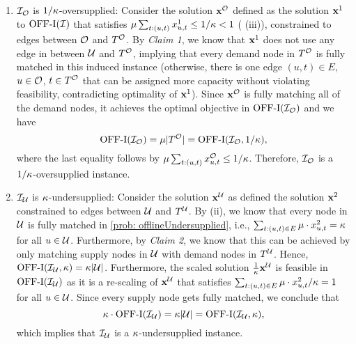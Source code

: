 {\begin{enumerate}
    \item $\mathcal I_{\mathcal O}$ is $1/\kappa$-oversupplied: Consider the solution $\mathbf{x}^\mathcal O$ defined as the solution $\mathbf{x}^1$ to $\mathrm{\mathrm{OFF}}\textrm{-}\mathrm{I}(\mathcal I)$ that satisfies $\mu \sum_{t:(u,t)} x_{u,t}^1 \leq 1/\kappa<1$ ( (iii)), constrained to edges between $\mathcal O$ and $T^\mathcal O$. By \emph{Claim 1}, we know that $\mathbf{x}^1$ does not use any edge in between $\mathcal U$ and $T^\mathcal O$, implying that every demand node in $T^\mathcal O$ is fully matched in this induced instance (otherwise, there is one edge $(u,t) \in E$, $u \in \mathcal O$, $t \in T^\mathcal O$ that can be assigned more capacity without violating feasibility, contradicting optimality of $\mathbf{x}^1$). Since $\mathbf{x}^\mathcal O$ is fully matching all of the demand nodes, it achieves the optimal objective in $\mathrm{\mathrm{OFF}}\textrm{-}\mathrm{I}(\mathcal I_\mathcal O)$ and we have
    \begin{equation*}
        \mathrm{\mathrm{OFF}}\textrm{-}\mathrm{I}(\mathcal I_\mathcal O) = \mu |T^\mathcal O|=\mathrm{\mathrm{OFF}}\textrm{-}\mathrm{I}(\mathcal I_\mathcal O, 1/\kappa),
    \end{equation*}
    where the last equality follows by $\mu \sum_{t:(u,t)} x_{u,t}^\mathcal O \leq 1/\kappa$. Therefore, $\mathcal I_\mathcal O$ is a $1/\kappa$-oversupplied instance.
    \item $\mathcal I_{\mathcal U}$ is $\kappa$-undersupplied: Consider the solution $\mathbf{x}^\mathcal U$ as defined the solution $\mathbf{x}^2$
    constrained to edges between $\mathcal U$ and $T^{\mathcal U}$. By  (ii), we know that every node in $\mathcal U$ is fully matched in \ref{prob: offlineUndersupplied}, i.e., $\sum_{t:(u,t) \in E} \mu \cdot x_{u,t}^2 = \kappa$ for all $u \in \mathcal U$. Furthermore, by \emph{Claim 2}, we know that this can be achieved by only matching supply nodes in $\mathcal U$ with demand nodes in $T^{\mathcal U}$. Hence, $\mathrm{\mathrm{OFF}}\textrm{-}\mathrm{I}(\mathcal I_{\mathcal U}, \kappa) = \kappa |\mathcal U|$. Furthermore, the scaled solution $\frac{1}{\kappa} \mathbf{x}^\mathcal U$ is feasible in $\mathrm{\mathrm{OFF}}\textrm{-}\mathrm{I}(\mathcal I_{\mathcal U})$ as it is a re-scaling of $\mathbf{x}^\mathcal U$ that satisfies $\sum_{t:(u,t) \in E} \mu \cdot x_{u,t}^2 / \kappa = 1$ for all $u \in \mathcal U$. Since every supply node gets fully matched, we conclude that
    \begin{equation*}
        \kappa \cdot \mathrm{\mathrm{OFF}}\textrm{-}\mathrm{I}(\mathcal I_{\mathcal U}) = \kappa  |\mathcal U| = \mathrm{\mathrm{OFF}}\textrm{-}\mathrm{I}(\mathcal I_{\mathcal U}, \kappa),
    \end{equation*}
    which implies that $\mathcal I_\mathcal U$ is a $\kappa$-undersupplied instance.
\end{enumerate}

}
